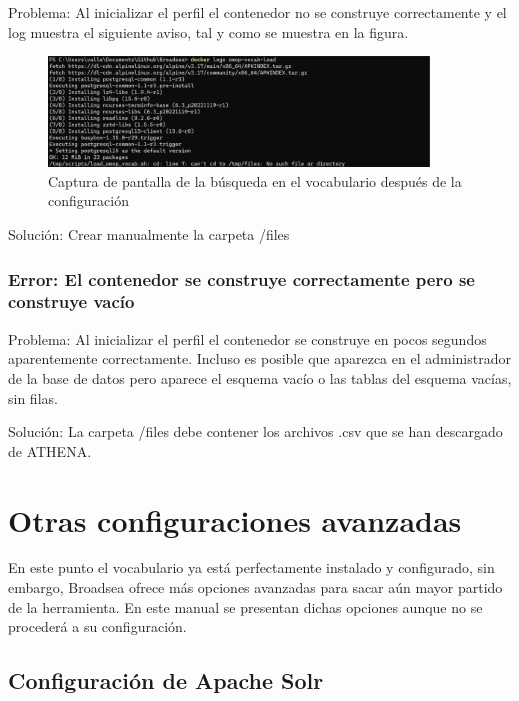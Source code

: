 Problema: Al inicializar el perfil  el contenedor no se construye correctamente y el log muestra el siguiente aviso, tal y como se muestra en la figura.

      \begin{figure}[H]
        \centering
        \includegraphics[width=0.90\textwidth]{figures/error05NoFile.png}
        \caption{Captura de pantalla de la búsqueda en el vocabulario después de la configuración}
        \label{fig:error05NoFile}
    \end{figure}
    
Solución: Crear manualmente la carpeta /files

\subsubsection{Error: El contenedor se construye correctamente pero se construye vacío}

Problema: Al inicializar el perfil  el contenedor se construye en pocos segundos aparentemente correctamente. Incluso es posible que aparezca en el administrador de la base de datos pero aparece el esquema vacío o las tablas del esquema vacías, sin filas.

Solución: La carpeta /files debe contener los archivos .csv que se han descargado de ATHENA.

\section{Otras configuraciones avanzadas} \label{sec:05ConfigAvanzada}

En este punto el vocabulario ya está perfectamente instalado y configurado, sin embargo, Broadsea ofrece más opciones avanzadas para sacar aún mayor partido de la herramienta. En este manual se presentan dichas opciones aunque no se procederá a su configuración.

\subsection{Configuración de Apache Solr} \label{subsec:05apache}

